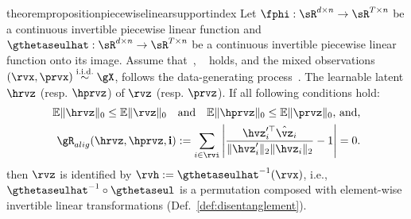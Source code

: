 \documentclass{article} %
\theoremstyle{plain}
\theoremstyle{definition}
\theoremstyle{remark}
\numberwithin{equation}{section}
\begin{document}
% 


\begin{restatable}{theorem}{propositionpiecewiselinearsupportindex}
\label{thm:Elementwise_Identifiability_piecewise}
Let $\fphi: \sR^{d \times n} \rightarrow \sR^{T \times n}$ be a continuous invertible piecewise linear function and $\gthetaseulhat: \sR^{d \times n} \rightarrow \sR^{T \times n}$ be a continuous invertible piecewise linear function onto its image. Assume that~,  ~ holds, and the mixed observations $(\rvx, \prvx) \overset{\scriptstyle \text{i.i.d.}}{\sim} \gX$, follows the data-generating process~. The learnable latent \( \hrvz \) (resp. \( \hprvz \))  of \( \rvz \) (resp. \( \prvz \)). If all following conditions hold:  
\begin{align}\label{eq:align}
    \mathbb{E}\|\hrvz\|_0 \leq \mathbb{E}\|\rvz\|_0 \quad \text{and} \quad \mathbb{E}\|\hprvz\|_0 \leq \mathbb{E}\|\prvz\|_0 \text{, and,} \\
    \gR_{alig}(\hrvz, \hprvz, \mathbf{i}) := \sum_{i \in \rvi} \left| \frac{\hvz_i^{\prime\top} \hat{\vz}_i}{\|\hvz'_i\|_2 \|\hvz_i\|_2} - 1 \right| = 0.
\end{align}
then $\rvz$ is identified by $\rvh:=\gthetaseulhat^{-1}(\rvx)$, i.e., $\gthetaseulhat^{-1} \circ \gthetaseul$ is a permutation composed with element-wise invertible linear transformations (Def.~\ref{def:disentanglement}).  
\end{restatable}
\end{document}
